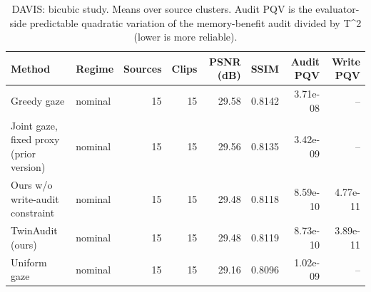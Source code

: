 \begin{table}[t]
\centering
\caption{DAVIS: bicubic study. Means over source clusters. Audit PQV is the evaluator-side predictable quadratic variation of the memory-benefit audit divided by T^2 (lower is more reliable).}
\label{tab:bicubic_DAVIS}
\small
\begin{tabular}{llrrrrrr}
\toprule
Method & Regime & Sources & Clips & PSNR (dB) & SSIM & Audit PQV & Write PQV \\
\midrule
Greedy gaze & nominal & 15 & 15 & 29.58 & 0.8142 & 3.71e-08 & -- \\
Joint gaze, fixed proxy (prior version) & nominal & 15 & 15 & 29.56 & 0.8135 & 3.42e-09 & -- \\
Ours w/o write-audit constraint & nominal & 15 & 15 & 29.48 & 0.8118 & 8.59e-10 & 4.77e-11 \\
TwinAudit (ours) & nominal & 15 & 15 & 29.48 & 0.8119 & 8.73e-10 & 3.89e-11 \\
Uniform gaze & nominal & 15 & 15 & 29.16 & 0.8096 & 1.02e-09 & -- \\
\bottomrule
\end{tabular}
\end{table}
